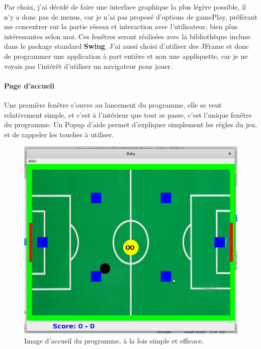 \documentclass[a4paper,12pt]{report}
\begin{document}
Par choix, j'ai décidé de faire une interface graphique la plus légère possible, il n'y a donc pas de menus, car je n'ai pas proposé d'options de gamePlay, préférant me concentrer sur la partie réseau et interaction avec l'utilisateur, bien plus intéressantes selon moi. Ces fenêtres seront réalisées avec la bibliothèque incluse dans le package standard \textbf{Swing}. J'ai aussi choisi d'utiliser des JFrame et donc de programmer une application à part entière et non une appliquette, car je ne voyais pas l'intérêt d'utiliser un navigateur pour jouer.

\paragraph{Page d'accueil}

Une première fenêtre s'ouvre au lancement du programme, elle se veut relativement simple, et c'est à l'intérieur que tout se passe, c'est l'unique fenêtre du programme. Un Popup d'aide permet d'expliquer simplement les règles du jeu, et de rappeler les touches à utiliser.

\begin{figure}[H]

\begin{center}

\includegraphics[width=15cm]{pictures/header.jpg}

\end{center}

\caption{Image d'accueil du programme, à la fois simple et efficace.}

\end{figure}
\end{document}
